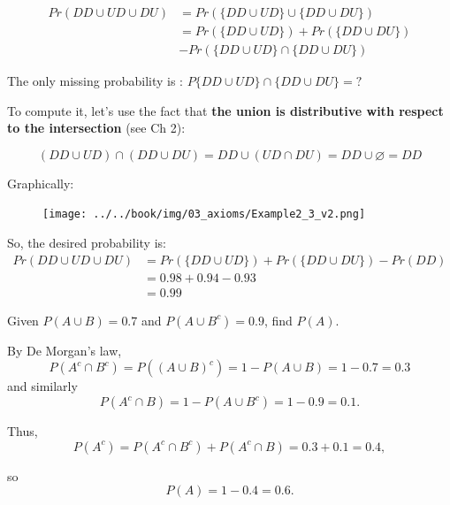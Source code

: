 \documentclass[notes=show,handout]{beamer}\usepackage[]{graphicx}\usepackage[]{color}
\begin{document}
\begin{frame}{\secname}
  \begin{example}

  \begin{footnotesize}
  \begin{align*}
  Pr(DD \cup UD \cup DU) &= Pr(\{DD \cup UD\} \cup \{DD \cup DU\})\\
  &= Pr(\{DD \cup UD\}) + Pr(\{DD \cup DU\})\\
  &- Pr(\{DD \cup UD\} \cap \{DD \cup DU\})
  \end{align*}

  The only missing probability is : $P\{DD \cup UD\} \cap \{DD \cup DU\} = ?$

  To compute it, let's use the fact that \textbf{the union is distributive with respect to the intersection} (see Ch 2):

  $$(DD \cup UD) \cap (DD \cup DU) = DD \cup (UD \cap DU) =DD \cup \varnothing = DD$$
  \end{footnotesize}
  \end{example}
\end{frame}

\begin{frame}{\secname}
  \begin{example}
  \begin{footnotesize}
  Graphically:
  \begin{figure}[h!]
  \centering
  \texttt{[image: ../../book/img/03\_axioms/Example2\_3\_v2.png]}
  \end{figure}

  So, the desired probability is:
  \begin{align*}
    Pr(DD \cup UD \cup DU) &= Pr(\{DD \cup UD\}) + Pr(\{DD \cup DU\}) - Pr(DD) \\
    &= 0.98 + 0.94-0.93 \\
    &= 0.99
  \end{align*}
  \end{footnotesize}
  \end{example}
\end{frame}


\begin{frame}{\secname}
  \begin{example}
  \begin{small}
  Given  $P(A\cup B)=0.7$ and $P(A\cup {B}^c) = 0.9$, find $P(A)$.


  \vspace{0.2cm}


  By De Morgan's law,
  $$P(A^c \cap B^c) = P((A\cup B )^c) = 1 - P(A\cup B) = 1 - 0.7 = 0.3$$
  and similarly
  $$P(A^c \cap B) = 1 - P(A \cup B^c) = 1- 0.9 = 0.1.$$

  Thus,
  $$P(A^c)=P(A^c \cap B^c )+P(A^c \cap B)= 0.3+ 0.1= 0.4,$$

  so
  $$P(A)=1 - 0.4= 0.6.$$
  \end{small}
   \end{example}
\end{frame}
\end{document}
